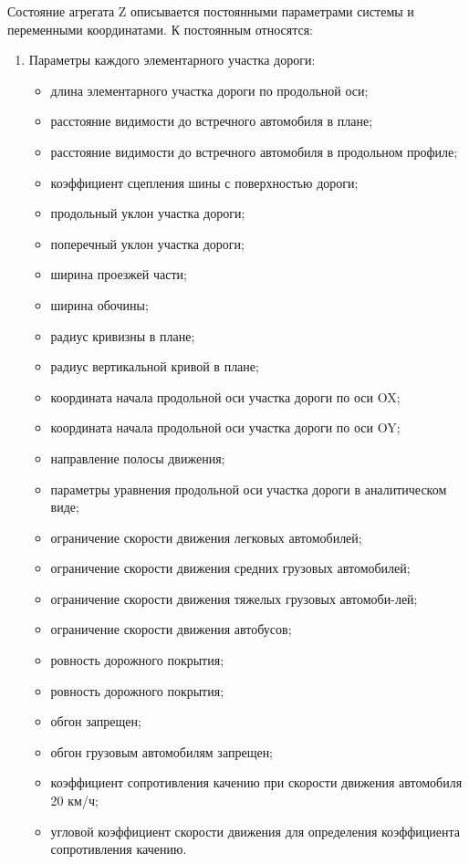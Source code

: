 \documentclass[a4paper,14pt]{article}
\begin{document}
Состояние агрегата Z описывается постоянными параметрами системы и переменными координатами. К постоянным относятся:
\begin{enumerate}
\item Параметры каждого элементарного участка дороги:

\begin{itemize}

\item длина элементарного участка дороги по продольной оси;
\item расстояние видимости до встречного автомобиля в плане;
\item расстояние видимости до встречного автомобиля в продольном профиле;
\item коэффициент сцепления шины с поверхностью дороги;
\item продольный уклон участка дороги;
\item поперечный уклон участка дороги;
\item ширина проезжей части;
\item ширина обочины;
\item радиус кривизны в плане;
\item радиус вертикальной кривой в плане;
\item координата начала продольной оси участка дороги по оси OX;
\item координата начала продольной оси участка дороги по оси OY;
\item направление полосы движения;
\item параметры уравнения продольной оси участка дороги в аналитическом виде;
\item ограничение скорости движения легковых автомобилей;
\item ограничение скорости движения средних грузовых автомобилей;
\item ограничение скорости движения тяжелых грузовых автомоби-лей;
\item ограничение скорости движения автобусов;
\item ровность дорожного покрытия;
\item ровность дорожного покрытия;
\item обгон запрещен;
\item обгон грузовым автомобилям запрещен;
\item коэффициент сопротивления качению при скорости движения автомобиля 20 км/ч;
\item угловой коэффициент скорости движения для определения коэффициента сопротивления качению.
\end{itemize}


\end{enumerate}
\end{document}
